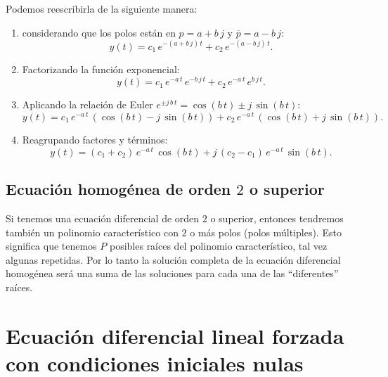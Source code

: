 Podemos reescribirla de la siguiente manera:
\begin{enumerate}
	\item considerando que los polos están en $p = a + b \, j$ y $\overline{p} = a - b \, j$:
	\begin{equation}
		y(t) = c_{1} \, e^{-(a + b \, j) \, t} + c_{2} \, e^{-(a - b \, j) \, t}.
	\end{equation}
	\item Factorizando la función exponencial:
	\begin{equation}
		y(t) = c_{1} \, e^{-a \, t} \, e^{-b \, j \, t} + c_{2} \, e^{-a \, t} \, e^{b \, j \, t}.
	\end{equation}
	\item Aplicando la relación de Euler $e^{\pm j \, b \, t} = \cos(b \, t) \pm j \, \sin(b \, t)$:
	\begin{equation}
		y(t) = c_{1} \, e^{-a \, t} \, (\cos(b \, t) - j \, \sin(b \, t)) + 
		c_{2} \, e^{-a \, t} \, (\cos(b \, t) + j \, \sin(b \, t)).
	\end{equation}
	\item Reagrupando factores y términos:
	\begin{equation}
		y(t) = (c_{1} + c_{2}) \, e^{-a \, t} \, \cos(b \, t) + j \, (c_{2} - c_{1}) \, e^{-a \, t} \, \sin(b \, t).
	\end{equation}
\end{enumerate}

\subsection{Ecuación homogénea de orden $2$ o superior}

Si tenemos una ecuación diferencial de orden $2$ o superior, entonces tendremos también un polinomio característico con $2$ o más polos (polos múltiples). Esto significa que tenemos $P$ posibles raíces del polinomio característico, tal vez algunas repetidas. Por lo tanto la solución completa de la ecuación diferencial homogénea será una suma de las soluciones para cada una de las ``diferentes'' raíces.

\section{Ecuaci\'{o}n diferencial lineal forzada con condiciones iniciales nulas}

